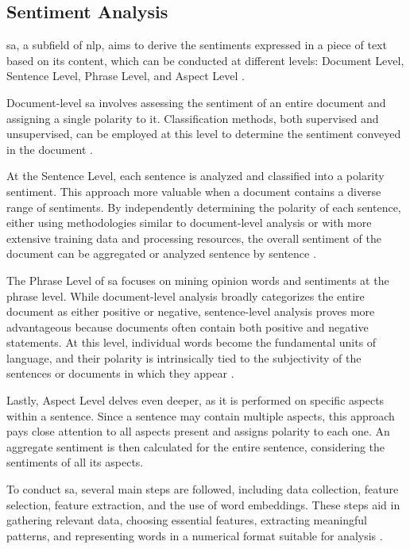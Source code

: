 \documentclass[a4paper,fleqn]{cas-dc}
\begin{document}
\subsection{Sentiment Analysis}

\gls{sa}, a subfield of \gls{nlp}, aims to derive the sentiments expressed in a piece of text based on its content, which can be conducted at different levels: Document Level, Sentence Level, Phrase Level, and Aspect Level  \cite{kaur_survey_2017, wankhade_survey_2022}.

Document-level \gls{sa} involves assessing the sentiment of an entire document and assigning a single polarity to it. Classification methods, both supervised and unsupervised, can be employed at this level to determine the sentiment conveyed in the document \cite{wankhade_survey_2022}.

At the Sentence Level, each sentence is analyzed and classified into a polarity sentiment. This approach more valuable when a document contains a diverse range of sentiments. By independently determining the polarity of each sentence, either using methodologies similar to document-level analysis or with more extensive training data and processing resources, the overall sentiment of the document can be aggregated or analyzed sentence by sentence  \cite{wankhade_survey_2022}.

The Phrase Level of \gls{sa} focuses on mining opinion words and sentiments at the phrase level. While document-level analysis broadly categorizes the entire document as either positive or negative, sentence-level analysis proves more advantageous because documents often contain both positive and negative statements. At this level, individual words become the fundamental units of language, and their polarity is intrinsically tied to the subjectivity of the sentences or documents in which they appear \cite{wankhade_survey_2022}.

Lastly, Aspect Level delves even deeper, as it is performed on specific aspects within a sentence. Since a sentence may contain multiple aspects, this approach pays close attention to all aspects present and assigns polarity to each one. An aggregate sentiment is then calculated for the entire sentence, considering the sentiments of all its aspects.

To conduct \gls{sa}, several main steps are followed, including data collection, feature selection, feature extraction, and the use of word embeddings. These steps aid in gathering relevant data, choosing essential features, extracting meaningful patterns, and representing words in a numerical format suitable for analysis  \cite{kaur_survey_2017}.
\end{document}
